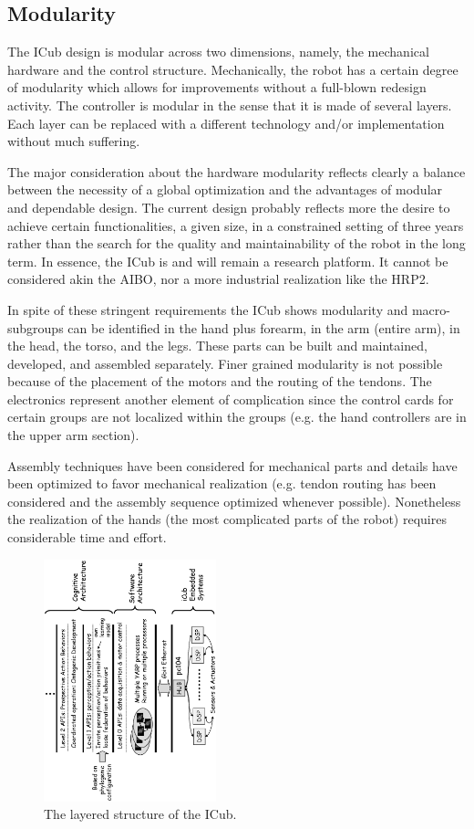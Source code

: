 \subsection{Modularity}
The ICub design is modular across two dimensions, namely, the mechanical hardware
and the control structure. Mechanically, the robot has a certain degree of modularity
which allows for improvements without a full-blown redesign activity. The controller
is modular in the sense that it is made of several layers. Each layer can be replaced
with a different technology and/or implementation without much suffering.

The major consideration about the hardware modularity reflects clearly a balance
between the necessity of a global optimization and the advantages of modular and 
dependable design. The current design probably reflects more the desire
to achieve certain functionalities, a given size, in a constrained setting of three 
years rather than the search for the quality and maintainability of the robot in
the long term. In essence, the ICub is and will remain a research platform. It cannot
be considered akin the AIBO, nor a more industrial realization like the HRP2.

In spite of these stringent requirements the ICub shows modularity and macro-subgroups
can be identified in the hand plus forearm, in the arm (entire arm), in the head, the torso,
and the legs. These parts can be built and maintained, developed, and assembled 
separately. Finer grained modularity is not possible because of the placement of the
motors and the routing of the tendons. The electronics represent another element of
complication since the control cards for certain groups are not localized within the 
groups (e.g. the hand controllers are in the upper arm section).

Assembly techniques have been considered for mechanical parts and details have been
optimized to favor mechanical realization (e.g. tendon routing has been considered and
the assembly sequence optimized whenever possible). Nonetheless the realization 
of the hands (the most complicated parts of the robot) requires considerable time 
and effort.

\begin{figure}[tbp]
\centerline{
\includegraphics[width=5cm]{layers}
}
\caption{The layered structure of the ICub. \label{fig:layers}}
\end{figure}

